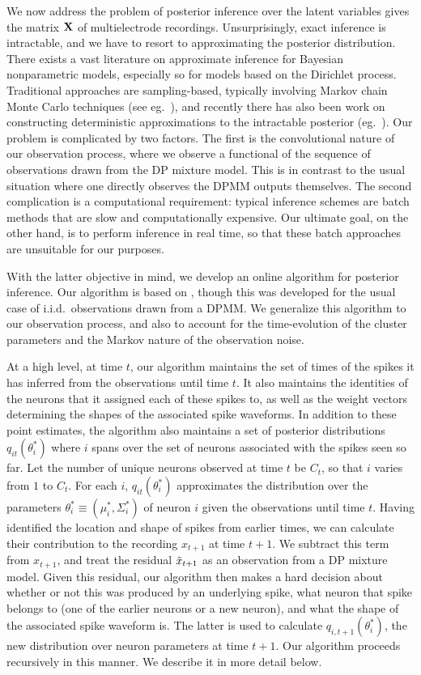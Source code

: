 We now address the problem of posterior inference over the latent variables gives the matrix $\mathbf{X}$ of multielectrode recordings. Unsurprisingly, exact 
inference is intractable, and we have to resort to approximating the posterior distribution.
There exists a vast literature on approximate inference for Bayesian nonparametric models, especially so for models based on the Dirichlet process.
Traditional approaches are sampling-based, typically involving Markov chain Monte Carlo techniques (see eg.\ \citep{Nea2000, IshJam2001}), 
and recently there has also been work on constructing deterministic approximations to the intractable posterior (eg.\ \citep{BleJor2006, MinGha2003}).
Our problem is complicated by two factors. The first is the convolutional nature of our observation process, where we observe a functional of the 
sequence of observations drawn from the DP mixture model. This is in contrast to the usual situation where one directly observes the DPMM outputs themselves.
The second complication is a computational requirement: typical inference schemes are batch methods that are slow and computationally expensive. 
Our ultimate goal, on the other hand, is to perform inference in real time, so that these batch approaches are unsuitable for our purposes.

With the latter objective in mind, we develop an online algorithm for posterior inference. Our algorithm is based on \cite{WangDun2009}, though this was 
developed for the usual case of i.i.d.\ observations drawn from a DPMM. We generalize this algorithm to our observation process, and also 
to account for the time-evolution of the cluster parameters and the Markov nature of the observation noise.

At a high level, at time $t$, our algorithm maintains the set of times of the spikes it has inferred from the observations until time $t$. It also maintains
the identities of the neurons that it assigned each of these spikes to, as well as the weight vectors determining the shapes of the associated spike 
waveforms. In addition to these point estimates, the algorithm also maintains a set of posterior distributions $q_{it}(\theta^*_i)$ where $i$ spans over the
set of neurons associated with the spikes seen so far. Let the number of unique neurons observed at time $t$ be $C_t$, so that $i$ varies from $1$ to $C_t$.
For each $i$, $q_{it}(\theta^*_i)$ approximates the distribution over the parameters 
$\theta_i^* \equiv (\mu_i^*, \Sigma_i^*)$ of neuron $i$ given the observations until time $t$. 
Having identified the location and shape of spikes from earlier times, we can calculate their contribution to the recording $x_{t+1}$ at time $t+1$.
We subtract this term from $x_{t+1}$, and treat the residual $\tilde{x}_{t+1}$ as an observation from a DP mixture model.
Given this residual, our algorithm then makes a hard decision about whether or not this was produced by an underlying spike, what neuron that spike belongs 
to (one of the earlier neurons or a new neuron), and what the shape of the associated spike waveform is. The latter is used to calculate
$q_{i,t+1}(\theta^*_i)$, the new distribution over neuron parameters at time $t+1$. Our algorithm proceeds recursively in this manner. 
We describe it in more detail below.


